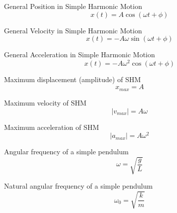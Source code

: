 \documentclass[12pt, letterpaper, twoside]{article}
\begin{document}
General Position in Simple Harmonic Motion
$$ x(t)  = A \cos (\omega t + \phi) $$


General Velocity in Simple Harmonic Motion
$$ x(t)  = -A \omega \sin (\omega t + \phi) $$


General Acceleration in Simple Harmonic Motion
$$ x(t)  = -A \omega^2 \cos (\omega t + \phi) $$


Maximum displacement (amplitude) of SHM
$$ x_{max} = A $$


Maximum velocity of SHM
$$ |v_{max}| = A \omega $$


Maximum acceleration of SHM
$$ |a_{max}| = A \omega^2 $$



Angular frequency of a simple pendulum
$$ \omega = \sqrt{\frac{g}{L}} $$



Natural angular frequency of a simple pendulum
$$ \omega_0 = \sqrt{\frac{k}{m}} $$











\newpage
\end{document}
